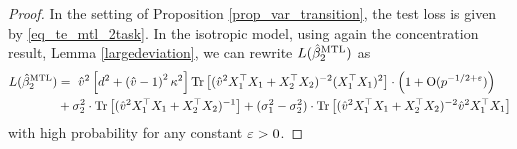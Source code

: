 \begin{proof}%
In the setting of Proposition \ref{prop_var_transition}, the test loss is given by \eqref{eq_te_mtl_2task}. 
In the isotropic model, using again the concentration result, Lemma \ref{largedeviation}, we can rewrite $L(\hat{\beta}_2^{\text{MTL}})$ as
\begin{align*}
	L(\hat{\beta}_2^{\text{MTL}}) &=~ \hat{v}^2 \left[d^2 +\left( \hat v-1\right)^2\kappa^2\right]\operatorname{Tr}\left[ (\hat{v}^2 X_1^{\top}X_1 + X_2^{\top}X_2)^{-2} (X_1^{\top}X_1)^2\right] \cdot \left(1+\operatorname{O}(p^{-1/2+{\varepsilon}})\right)\nonumber \\
	& + \sigma_2^2 \cdot \operatorname{Tr}\left[(\hat{v}^2 X_1^{\top}X_1 + X_2^{\top}X_2)^{-1} \right] + (\sigma_1^2 -\sigma_2^2)  \cdot \operatorname{Tr}\left[(\hat{v}^2 X_1^{\top}X_1 + X_2^{\top}X_2)^{-2} \hat v^2X_1^\top X_1\right]
\end{align*}
with high probability for any constant ${\varepsilon}>0$. 




\end{proof}
